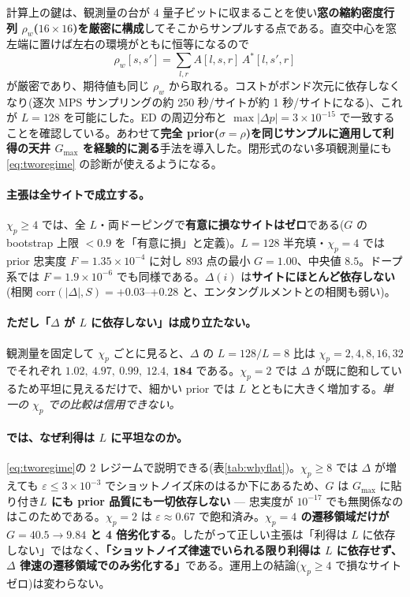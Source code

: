 \documentclass[11pt,a4paper]{ltjsarticle}
\begin{document}
計算上の鍵は、観測量の台が 4 量子ビットに収まることを使い\textbf{窓の縮約密度行列 $\rho_w$($16\times16$)を厳密に構成}してそこからサンプルする点である。直交中心を窓左端に置けば左右の環境がともに恒等になるので
\begin{equation}
  \rho_w[s,s'] = \sum_{l,r} A[l,s,r]\,A^*[l,s',r]
\end{equation}
が厳密であり、期待値も同じ $\rho_w$ から取れる。コストがボンド次元に依存しなくなり(逐次 MPS サンプリングの約 250 秒/サイトが約 1 秒/サイトになる)、これが $L=128$ を可能にした。ED の周辺分布と $\max|\Delta p|=3\times10^{-15}$ で一致することを確認している。あわせて\textbf{完全 prior($\sigma=\rho$)を同じサンプルに適用して利得の天井 $G_{\max}$ を経験的に測る}手法を導入した。閉形式のない多項観測量にも \eqref{eq:tworegime} の診断が使えるようになる。

\paragraph{主張は全サイトで成立する。}$\chi_p\ge4$ では、全 $L$・両ドーピングで\textbf{有意に損なサイトはゼロ}である($G$ の bootstrap 上限 $<0.9$ を「有意に損」と定義)。$L=128$ 半充填・$\chi_p=4$ では prior 忠実度 $F=1.35\times10^{-4}$ に対し 893 点の最小 $G=1.00$、中央値 $8.5$。ドープ系では $F=1.9\times10^{-6}$ でも同様である。$\Delta(i)$ は\textbf{サイトにほとんど依存しない}(相関 $\mathrm{corr}(|\Delta|,S)=+0.03$--$+0.28$ と、エンタングルメントとの相関も弱い)。

\paragraph{ただし「$\Delta$ が $L$ に依存しない」は成り立たない。}観測量を固定して $\chi_p$ ごとに見ると、$\Delta$ の $L=128/L=8$ 比は $\chi_p=2,4,8,16,32$ でそれぞれ $1.02,\ 4.97,\ 0.99,\ 12.4,\ \mathbf{184}$ である。$\chi_p=2$ では $\Delta$ が既に飽和しているため平坦に見えるだけで、細かい prior では $L$ とともに大きく増加する。\emph{単一の $\chi_p$ での比較は信用できない。}

\paragraph{では、なぜ利得は $L$ に平坦なのか。}\eqref{eq:tworegime}の 2 レジームで説明できる(表\ref{tab:whyflat})。$\chi_p\ge8$ では $\Delta$ が増えても $\varepsilon\le3\times10^{-3}$ でショットノイズ床のはるか下にあるため、$G$ は $G_{\max}$ に貼り付き\textbf{$L$ にも prior 品質にも一切依存しない} --- 忠実度が $10^{-17}$ でも無関係なのはこのためである。$\chi_p=2$ は $\varepsilon\approx0.67$ で飽和済み。\textbf{$\chi_p=4$ の遷移領域だけが $G=40.5\to9.84$ と 4 倍劣化する}。したがって正しい主張は「利得は $L$ に依存しない」ではなく、\textbf{「ショットノイズ律速でいられる限り利得は $L$ に依存せず、$\Delta$ 律速の遷移領域でのみ劣化する」}である。運用上の結論($\chi_p\ge4$ で損なサイトゼロ)は変わらない。
\end{document}
